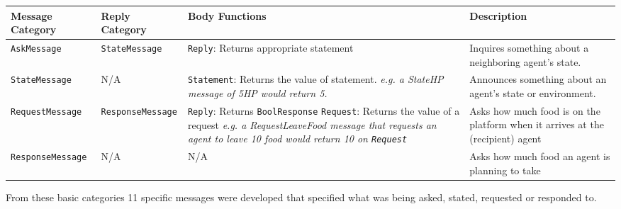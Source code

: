 \documentclass{article}
\begin{document}
\begin{center}
\begin{tabular}{p{3cm}p{3cm}p{5cm}p{3.5cm}}
 \hline
 \textbf{Message \newline Category} & \textbf{Reply \newline Category} & \textbf{Body Functions} & \textbf{Description} \\ [0.5ex] 
 \hline\hline
 \texttt{AskMessage} & \texttt{StateMessage} &  \texttt{Reply}: Returns appropriate statement & Inquires something about a neighboring agent's state. \\
 \hline
 \texttt{StateMessage} & N/A & \texttt{Statement}: Returns the value of statement. \textit{e.g. a StateHP message of 5HP would return 5.} & Announces something about an agent's state or environment. \\ 
 \hline
 \texttt{RequestMessage} & \texttt{ResponseMessage} & \texttt{Reply}: Returns \texttt{BoolResponse} \newline \texttt{Request}: Returns the value of a request \textit{e.g. a RequestLeaveFood message that requests an agent to leave 10 food would return 10 on \texttt{Request}} & Asks how much food is on the platform when it arrives at the (recipient) agent \\ 
 \hline
 \texttt{ResponseMessage} & N/A & N/A & Asks how much food an agent is planning to take \\ 
 \hline
\end{tabular}
\end{center}
From these basic categories 11 specific messages were developed that specified what was being asked, stated, requested or responded to.
\end{document}
